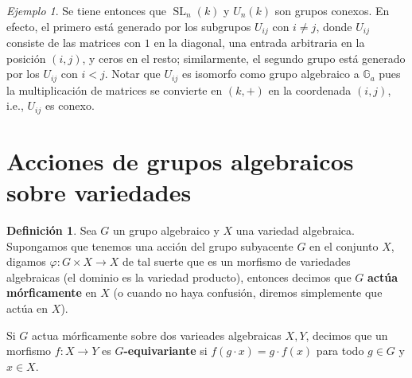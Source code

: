 \documentclass[spanish,10pt]{amsart}
\theoremstyle{definition}
\newtheorem{definition}[theorem]{Definición}
\theoremstyle{remark}
\newtheorem{example}[theorem]{Ejemplo}
\numberwithin{equation}{section}
\begin{document}
\begin{example}
Se tiene entonces que $\operatorname{SL}_n (k)$ y $U_n (k)$ son grupos conexos. En efecto, el primero está generado por los subgrupos $U_{ij}$ con $i \neq j$, donde $U_{ij}$ consiste de las matrices con $1$ en la diagonal, una entrada arbitraria en la posición $(i, j)$, y ceros en el resto; similarmente, el segundo grupo está generado por los $U_{ij}$ con $i < j$. Notar que $U_{ij}$ es isomorfo como grupo algebraico a $\mathbb{G}_a$ pues la multiplicación de matrices se convierte en $(k, +)$ en la coordenada $(i,j)$, i.e., $U_{ij}$ es conexo.
\end{example}


\section{Acciones de grupos algebraicos sobre variedades}

\begin{definition}
Sea $G$ un grupo algebraico y $X$ una variedad algebraica. Supongamos que tenemos una acción del grupo subyacente $G$ en el conjunto $X$, digamos $\varphi : G \times X \to X$ de tal suerte que es un morfismo de variedades algebraicas (el dominio es la variedad producto), entonces decimos que $G$ \textbf{actúa mórficamente} en $X$ (o cuando no haya confusión, diremos simplemente que actúa en $X$).

Si $G$ actua mórficamente sobre dos varieades algebraicas $X,Y$, decimos que un morfismo $f : X \to Y$ es \textbf{$G$-equivariante} si $f(g \cdot x) = g \cdot f(x)$ para todo $g \in G$ y $x \in X$.
\end{definition}
\end{document}
